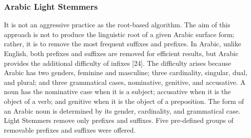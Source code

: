 \subsubsection{Arabic Light Stemmers}
It is not an aggressive practice as the root-based algorithm. The aim of this approach is not to produce the linguistic root of a given Arabic surface form; rather, it is to remove the most frequent suffixes and prefixes.
In Arabic, unlike English, both prefixes and
suffixes are removed for efficient results, but Arabic provides the additional difficulty of infixes
[24]. The difficulty arises because Arabic has two genders, feminine and masculine; three
cardinality, singular, dual, and plural; and three grammatical cases, nominative, genitive, and
accusative. A noun has the nominative case when it is a subject; accusative when it is the object
of a verb; and genitive when it is the object of a preposition. The form of an Arabic noun is
determined by its gender, cardinality, and grammatical case. Light Stemmers remove only prefixes and suffixes. Five pre-defined groups of removable
prefixes and suffixes were offered.

